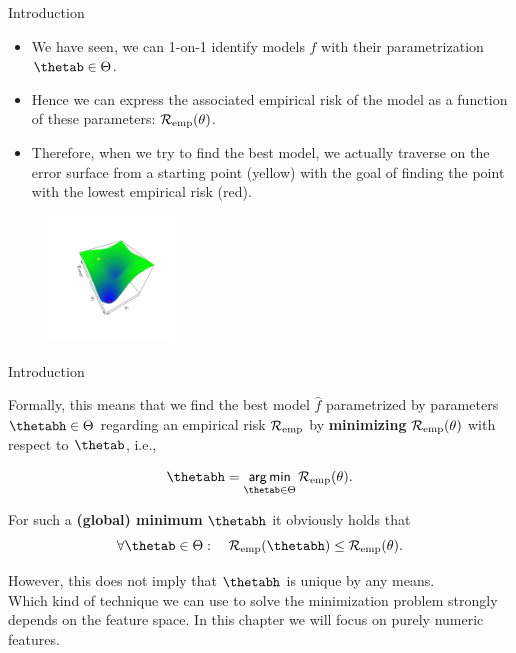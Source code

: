 \documentclass[11pt,compress,t,notes=noshow, xcolor=table]{beamer}
\begin{document}
\begin{vbframe}{Introduction}
\begin{itemize}
\item We have seen, we can 1-on-1 identify models $f$ with their parametrization $\thetab \in \Theta$. 
\item Hence we can express the associated empirical risk of the model as a function of these parameters: $\mathcal{R}_{\text{emp}}(\theta)$.
\item Therefore, when we try to find the best model, we actually traverse on the error surface from a starting point (yellow) with the goal of finding the point with the lowest empirical risk (red).
\end{itemize}
\begin{center}
\begin{figure}[!b]
\includegraphics[trim=2.4cm 2.4cm 2.4cm 2.4cm, width=0.3\textwidth]{figure/err_surf}
\end{figure}
\end{center}

\end{vbframe}
\begin{vbframe}{Introduction}

Formally, this means that we find the best model $\hat f$ parametrized by parameters $\thetabh \in \Theta$ regarding an empirical risk $\mathcal{R}_{\text{emp}}$ by \textbf{minimizing} $\mathcal{R}_{\text{emp}}(\theta)$ with respect to $\thetab$, i.e., 

\[
\thetabh  = \argmin_{\thetab \in \Theta} \risket .
\]

For such a \textbf{(global) minimum} $\thetabh$ it obviously holds that 
\[
\forall \thetab \in \Theta :\quad \riske(\thetabh) \leq \risket .
\]

However, this does not imply that $\thetabh$ is unique by any means. \\
\lz
Which kind of technique we can use to solve the minimization problem strongly depends on the feature space. In this chapter we will focus on purely numeric features.

\end{vbframe}
\end{document}
